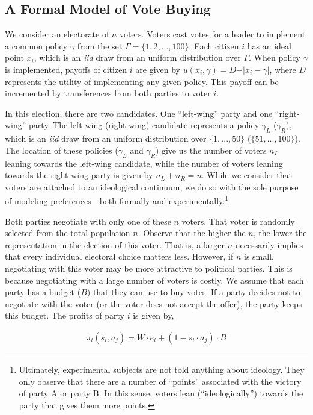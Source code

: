 % 
\subsection{A Formal Model of Vote Buying}\label{formal:model}

We consider an electorate of $n$ voters. Voters cast votes for a leader to implement a common policy $\gamma$ from the set $\Gamma=\{1,2,...,100\}$. Each citizen $i$ has an ideal point $x_i$, which is an \emph{iid} draw from an uniform distribution over $\Gamma$. When policy $\gamma$ is implemented, payoffs of citizen $i$ are given by $u(x_i,\gamma)=D-\vert x_i-\gamma \vert$, where $D$ represents the utility of implementing any given policy. This payoff can be incremented by transferences from both parties to voter $i$.

In this election, there are two candidates. One ``left-wing'' party and one ``right-wing'' party. The left-wing (right-wing) candidate represents a policy $\gamma_L$ ($\gamma_R$), which is an \emph{iid} draw from an uniform distribution over $\{1,...,50\}$ ($\{51,...,100\}$). The location of these policies ($\gamma_L$ and $\gamma_R$) give us the number of voters $n_L$ leaning towards the left-wing candidate, while the number of voters leaning towards the right-wing party is given by $n_L+n_R=n$. While we consider that voters are attached to an ideological continuum, we do so with the sole purpose of modeling preferences---both formally and experimentally.\footnote{Ultimately, experimental subjects are not told anything about ideology. They only observe that there are a number of ``points'' associated with the victory of party A or party B. In this sense, voters lean (``ideologically'') towards the party that gives them more points.}

Both parties negotiate with only one of these $n$ voters. That voter is randomly selected from the total population $n$. Observe that the higher the $n$, the lower the representation in the election of this voter. That is, a larger $n$ necessarily implies that every individual electoral choice matters less. However, if $n$ is small, negotiating with this voter may be more attractive to political parties. This is because negotiating with a large number of voters is costly. We assume that each party has a budget ($B$) that they can use to buy votes. If a party decides not to negotiate with the voter (or the voter does not accept the offer), the party keeps this budget. The profits of party $i$ is given by,

\begin{equation}
\begin{aligned}
  \pi_i(s_i,a_j)=W\cdot e_i+(1-s_i\cdot a_j )\cdot B
\end{aligned}
\end{equation}

